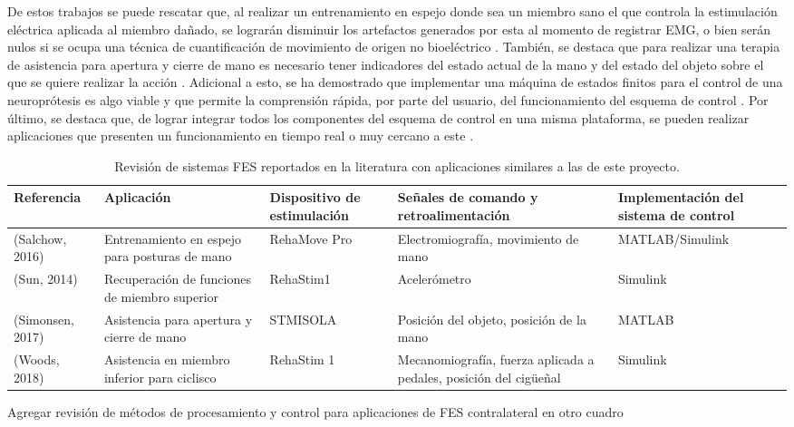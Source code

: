De estos trabajos se puede rescatar que, al realizar un entrenamiento en espejo donde sea un miembro sano el que controla la estimulación eléctrica aplicada al miembro dañado, se lograrán disminuir los artefactos generados por esta al momento de registrar EMG, o bien serán nulos si se ocupa una técnica de cuantificación de movimiento de origen no bioeléctrico \cite{Salchow2016}. También, se destaca que para realizar una terapia de asistencia para apertura y cierre de mano es necesario tener indicadores del estado actual de la mano y del estado del objeto sobre el que se quiere realizar la acción \cite{Simonsen2017}. Adicional a esto, se ha demostrado que implementar una máquina de estados finitos para el control de una neuroprótesis es algo viable y que permite la comprensión rápida, por parte del usuario, del funcionamiento del esquema de control \cite{Sun2014}. Por último, se destaca que, de lograr integrar todos los componentes del esquema de control en una misma plataforma, se pueden realizar aplicaciones que presenten un funcionamiento en tiempo real o muy cercano a este \cite{Salchow2016}\cite{Sun2014}\cite{Woods2018}.

\begin{table}[hbt]
	\centering
	\begin{tabular}{|p{25mm}|p{35mm}|p{25mm}|p{40mm}|p{35mm}|}
	\hline
	\textbf{Referencia} & \textbf{Aplicación} & \textbf{Dispositivo de estimulación} & \textbf{Señales de comando y retroalimentación} & \textbf{Implementación del sistema de control}\\ 
	\hline
	(Salchow, 2016) & Entrenamiento en espejo para posturas de mano & RehaMove Pro & Electromiografía, movimiento de mano & MATLAB/Simulink\\
	\hline
	(Sun, 2014) & Recuperación de funciones de miembro superior & RehaStim1 & Acelerómetro & Simulink\\
	\hline
	(Simonsen, 2017) & Asistencia para apertura y cierre de mano & STMISOLA & Posición del objeto, posición de la mano & MATLAB\\
	\hline
	(Woods, 2018) & Asistencia en miembro inferior para ciclisco & RehaStim 1 & Mecanomiografía, fuerza aplicada a pedales, posición del cigüeñal & Simulink\\
	\hline
	\end{tabular}
	\centering
	\caption{Revisión de sistemas FES reportados en la literatura con aplicaciones similares a las de este proyecto.}
	\label{Cuadro:Sistemas FES}
\end{table}

{\color{red}Agregar revisión de métodos de procesamiento y control para aplicaciones de FES contralateral en otro cuadro}
